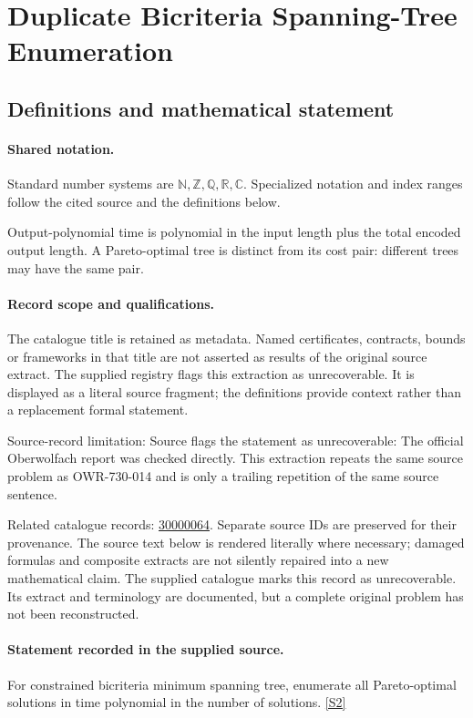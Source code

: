\documentclass[11pt]{article}
\newcommand{\sref}[2]{\hyperlink{source:#1:#2}{[S#2]}}
\begin{document}
\section{Duplicate Bicriteria Spanning-Tree Enumeration}\label{statement}

\subsection{Definitions and mathematical statement}

\paragraph{Shared notation.}Standard number systems are $\mathbb N,\mathbb Z,\mathbb Q,\mathbb R,\mathbb C$. Specialized notation and index ranges follow the cited source and the definitions below.


Output-polynomial time is polynomial in the input length plus the total encoded output length. A Pareto-optimal tree is distinct from its cost pair: different trees may have the same pair.
\paragraph{Record scope and qualifications.}
The catalogue title is retained as metadata. Named certificates, contracts, bounds or frameworks in that title are not asserted as results of the original source extract.
The supplied registry flags this extraction as unrecoverable. It is displayed as a literal source fragment; the definitions provide context rather than a replacement formal statement.

Source-record limitation: Source flags the statement as unrecoverable: The official Oberwolfach report was checked directly. This extraction repeats the same source problem as OWR-730-014 and is only a trailing repetition of the same source sentence.

Related catalogue records: \href{https://mehmetmars7.github.io/Erdosproblems-llm-hunter/problem.html?type=open_problems&id=30000064}{30000064}. Separate source IDs are preserved for their provenance.
The source text below is rendered literally where necessary; damaged formulas and composite extracts are not silently repaired into a new mathematical claim.
The supplied catalogue marks this record as unrecoverable. Its extract and terminology are documented, but a complete original problem has not been reconstructed.
\paragraph{Statement recorded in the supplied source.}
For constrained bicriteria minimum spanning tree, enumerate all Pareto-optimal solutions in time polynomial in the number of solutions. \sref{statement}{2}
\end{document}
